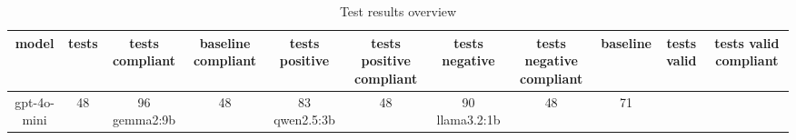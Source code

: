 
  \begin{table}[h!]
  \centering
  \begin{tabular}{|c|c|c|c|c|c|c|c|c|c|c|}
  \hline
  model & tests & tests compliant & baseline compliant & tests positive & tests positive compliant & tests negative & tests negative compliant & baseline & tests valid & tests valid compliant \\
  \hline
  gpt-4o-mini & 48 & 96%
\hline
gemma2:9b & 48 & 83%
\hline
qwen2.5:3b & 48 & 90%
\hline
llama3.2:1b & 48 & 71%
  \end{tabular}
  \caption{Test results overview}
  
  \end{table}
  